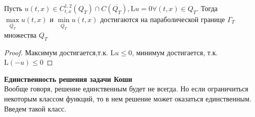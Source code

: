 \begin{conseq}
Пусть $u(t,x) \in C^{1,2}_{t,x}(Q_T) \cap C(\overline{Q_T}), \mathrm{L}u = 0 \forall(t,x) \in Q_T$.
 Тогда $\max\limits_{\overline{Q_T}}u(t,x)$ и $\min\limits_{\overline{Q_T}}u(t,x)$ достигаются на параболической границе $\Gamma_T$ множества $Q_T$
 \begin{proof}
 Максимум достигается,т.к. $\mathrm{L}u \leq 0$, минимум достигается, т.к. $\mathrm{L}(-u) \leq 0$
 \end{proof}
\end{conseq}


{\bf Единственность решения задачи Коши}\\
Вообще говоря, решение единственным будет не всегда. Но если
 ограничиться некоторым классом функций, то в нем решение может
  оказаться единственным. Введем такой класс.\\
  
